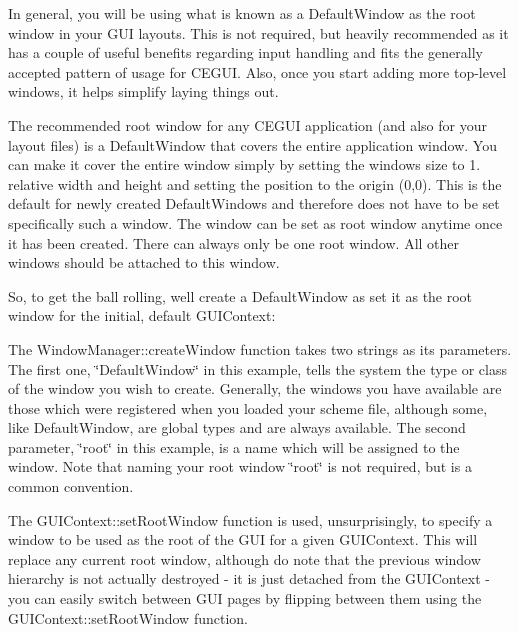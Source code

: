 In general, you will be using what is known as a Default\+Window as the \textquotesingle{}root\textquotesingle{} window in your G\+UI layouts. This is not required, but heavily recommended as it has a couple of useful benefits regarding input handling and fits the generally accepted pattern of usage for C\+E\+G\+UI. Also, once you start adding more top-\/level windows, it helps simplify laying things out.

The recommended root window for any C\+E\+G\+UI application (and also for your layout files) is a Default\+Window that covers the entire application window. You can make it cover the entire window simply by setting the window\textquotesingle{}s size to 1. relative width and height and setting the position to the origin (0,0). This is the default for newly created Default\+Windows and therefore does not have to be set specifically such a window. The window can be set as root window anytime once it has been created. There can always only be one root window. All other windows should be attached to this window.

So, to get the ball rolling, we\textquotesingle{}ll create a Default\+Window as set it as the root window for the initial, default G\+U\+I\+Context\+: 
\begin{DoxyCode}{0}
\end{DoxyCode}


The Window\+Manager\+::create\+Window function takes two strings as its parameters. The first one, {\ttfamily \char`\"{}\+Default\+Window\char`\"{}} in this example, tells the system the type or class of the window you wish to create. Generally, the windows you have available are those which were registered when you loaded your scheme file, although some, like Default\+Window, are global types and are always available. The second parameter, {\ttfamily \char`\"{}root\char`\"{}} in this example, is a name which will be assigned to the window. Note that naming your root window \char`\"{}root\char`\"{} is not required, but is a common convention.

The G\+U\+I\+Context\+::set\+Root\+Window function is used, unsurprisingly, to specify a window to be used as the root of the G\+UI for a given G\+U\+I\+Context. This will replace any current root window, although do note that the previous window hierarchy is not actually destroyed -\/ it is just detached from the G\+U\+I\+Context -\/ you can easily switch between G\+UI \textquotesingle{}pages\textquotesingle{} by flipping between them using the G\+U\+I\+Context\+::set\+Root\+Window function.

